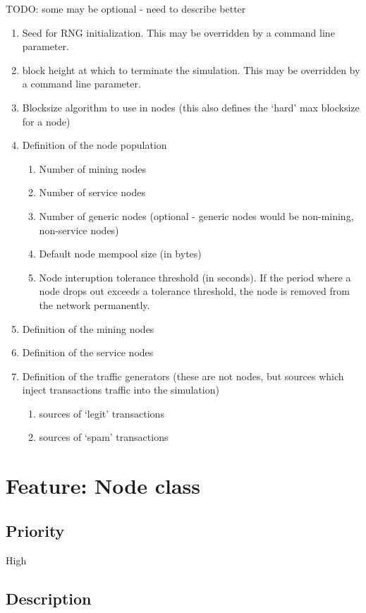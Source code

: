 \documentclass{scrreprt}
\begin{document}
TODO: some may be optional - need to describe better

\begin{enumerate}
\item Seed for RNG initialization. This may be overridden by a command line parameter.
\item block height at which to terminate the simulation. This may be overridden by a command line parameter.
\item Blocksize algorithm to use in nodes (this also defines the `hard' max blocksize for a node)
\item Definition of the node population
   \begin{enumerate}
   \item Number of mining nodes
   \item Number of service nodes
   \item Number of generic nodes (optional - generic nodes would be non-mining, non-service nodes)
   \item Default node mempool size (in bytes)
   \item Node interuption tolerance threshold (in seconds). If the period where a node drops out exceeds a tolerance threshold, the node is removed from the network permanently.
   \end{enumerate}
\item Definition of the mining nodes
\item Definition of the service nodes
\item Definition of the traffic generators (these are not nodes, but sources which inject transactions traffic into the simulation)
   \begin{enumerate}
   \item sources of `legit' transactions
   \item sources of `spam' transactions
   \end{enumerate}
\end{enumerate}



\section{Feature: Node class}
\subsection{Priority}

High

\subsection{Description}
\end{document}
